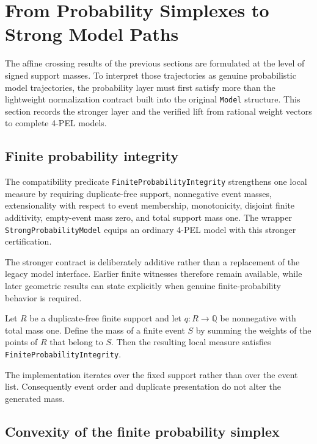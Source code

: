 \section{From Probability Simplexes to Strong Model Paths}
\label{sec:model-paths}

The affine crossing results of the previous sections are formulated at the level of signed support masses. To interpret those trajectories as genuine probabilistic model trajectories, the probability layer must first satisfy more than the lightweight normalization contract built into the original \texttt{Model} structure. This section records the stronger layer and the verified lift from rational weight vectors to complete 4-PEL models.

\subsection{Finite probability integrity}

The compatibility predicate \texttt{FiniteProbabilityIntegrity} strengthens one local measure by requiring duplicate-free support, nonnegative event masses, extensionality with respect to event membership, monotonicity, disjoint finite additivity, empty-event mass zero, and total support mass one. The wrapper \texttt{StrongProbabilityModel} equips an ordinary 4-PEL model with this stronger certification.

The stronger contract is deliberately additive rather than a replacement of the legacy model interface. Earlier finite witnesses therefore remain available, while later geometric results can state explicitly when genuine finite-probability behavior is required.

\begin{proposition}
Let \(R\) be a duplicate-free finite support and let \(q:R\to\mathbb{Q}\) be nonnegative with total mass one. Define the mass of a finite event \(S\) by summing the weights of the points of \(R\) that belong to \(S\). Then the resulting local measure satisfies \texttt{FiniteProbabilityIntegrity}.
\statusverified
\end{proposition}

The implementation iterates over the fixed support rather than over the event list. Consequently event order and duplicate presentation do not alter the generated mass.

\subsection{Convexity of the finite probability simplex}

